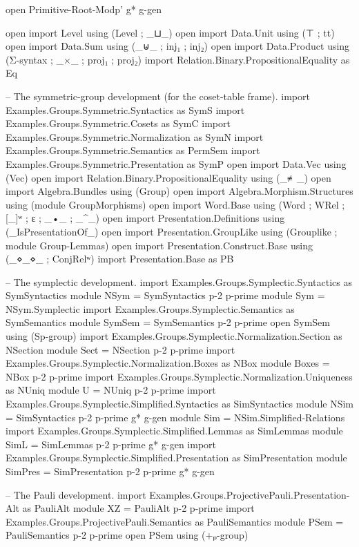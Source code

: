 \documentclass[aspectratio=169]{beamer}
\begin{document}
\begin{code}[hide]
open Primitive-Root-Modp' g* g-gen

open import Level using (Level ; _⊔_)
open import Data.Unit using (⊤ ; tt)
open import Data.Sum using (_⊎_ ; inj₁ ; inj₂)
open import Data.Product using (Σ-syntax ; _×_ ; proj₁ ; proj₂)
import Relation.Binary.PropositionalEquality as Eq

-- The symmetric-group development (for the coset-table frame).
import Examples.Groups.Symmetric.Syntactics as SymS
import Examples.Groups.Symmetric.Cosets as SymC
import Examples.Groups.Symmetric.Normalization as SymN
import Examples.Groups.Symmetric.Semantics as PermSem
import Examples.Groups.Symmetric.Presentation as SymP
open import Data.Vec using (Vec)
open import Relation.Binary.PropositionalEquality using (_≢_)
open import Algebra.Bundles using (Group)
open import Algebra.Morphism.Structures using (module GroupMorphisms)
open import Word.Base using (Word ; WRel ; [_]ʷ ; ε ; _•_ ; _^_)
open import Presentation.Definitions using (_IsPresentationOf_)
open import Presentation.GroupLike using (Grouplike ; module Group-Lemmas)
open import Presentation.Construct.Base using (_⋄_⋄_ ; ConjRelʷ)
import Presentation.Base as PB

-- The symplectic development.
import Examples.Groups.Symplectic.Syntactics as SymSyntactics
module NSym = SymSyntactics p-2 p-prime
module Sym = NSym.Symplectic
import Examples.Groups.Symplectic.Semantics as SymSemantics
module SymSem = SymSemantics p-2 p-prime
open SymSem using (Sp-group)
import Examples.Groups.Symplectic.Normalization.Section as NSection
module Sect = NSection p-2 p-prime
import Examples.Groups.Symplectic.Normalization.Boxes as NBox
module Boxes = NBox p-2 p-prime
import Examples.Groups.Symplectic.Normalization.Uniqueness as NUniq
module U = NUniq p-2 p-prime
import Examples.Groups.Symplectic.Simplified.Syntactics as SimSyntactics
module NSim = SimSyntactics p-2 p-prime g* g-gen
module Sim = NSim.Simplified-Relations
import Examples.Groups.Symplectic.Simplified.Lemmas as SimLemmas
module SimL = SimLemmas p-2 p-prime g* g-gen
import Examples.Groups.Symplectic.Simplified.Presentation as SimPresentation
module SimPres = SimPresentation p-2 p-prime g* g-gen

-- The Pauli development.
import Examples.Groups.ProjectivePauli.Presentation-Alt as PauliAlt
module XZ = PauliAlt p-2 p-prime
import Examples.Groups.ProjectivePauli.Semantics as PauliSemantics
module PSem = PauliSemantics p-2 p-prime
open PSem using (+ₚ-group)


\end{code}
\end{document}
